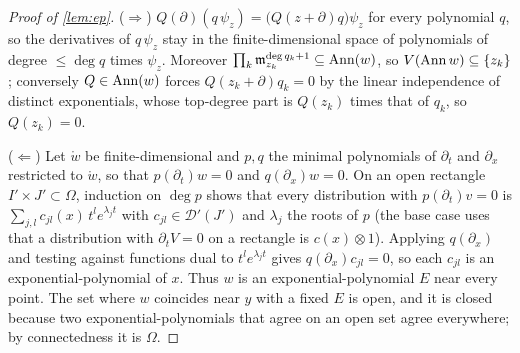 \begin{proof}[Proof of \cref{lem:ep}]
($\Rightarrow$) $Q(\partial)(q\,\psi_z)=\big(Q(z+\partial)q\big)\psi_z$ for every polynomial $q$, so the derivatives of
$q\,\psi_z$ stay in the finite-dimensional space of polynomials of degree $\le\deg q$ times $\psi_z$. Moreover
$\prod_k\mathfrak m_{z_k}^{\deg q_k+1}\subseteq\operatorname{Ann}(w)$, so $V(\operatorname{Ann} w)\subseteq\{z_k\}$; conversely
$Q\in\operatorname{Ann}(w)$ forces $Q(z_k+\partial)q_k=0$ by the linear independence of distinct exponentials, whose top-degree part
is $Q(z_k)$ times that of $q_k$, so $Q(z_k)=0$.

($\Leftarrow$) Let $\ring w$ be finite-dimensional and $p,q$ the minimal polynomials of $\partial_t$ and
$\partial_x$ restricted to $\ring w$, so that $p(\partial_t)w=0$ and $q(\partial_x)w=0$. On an open rectangle $I'\times J'\subset\Omega$, induction
on $\deg p$ shows that every distribution with $p(\partial_t)v=0$ is $\sum_{j,l}c_{jl}(x)\,t^le^{\lambda_jt}$ with
$c_{jl}\in\mathcal D'(J')$ and $\lambda_j$ the roots of $p$ (the base case uses that a distribution with
$\partial_tV=0$ on a rectangle is $c(x)\otimes1$). Applying $q(\partial_x)$ and testing against functions dual to
$t^le^{\lambda_jt}$ gives $q(\partial_x)c_{jl}=0$, so each $c_{jl}$ is an exponential-polynomial of $x$. Thus $w$ is an
exponential-polynomial $E$ near every point. The set where $w$ coincides near $y$ with a fixed $E$ is open, and it is
closed because two exponential-polynomials that agree on an open set agree everywhere; by connectedness it is
$\Omega$.
\end{proof}

